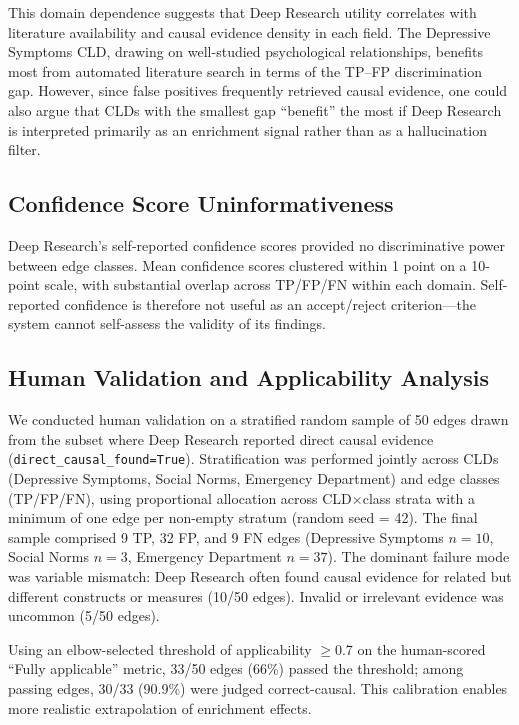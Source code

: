 This domain dependence suggests that Deep Research utility correlates with literature availability and causal evidence density in each field. The Depressive Symptoms CLD, drawing on well-studied psychological relationships, benefits most from automated literature search in terms of the TP--FP discrimination gap. However, since false positives frequently retrieved causal evidence, one could also argue that CLDs with the smallest gap ``benefit'' the most if Deep Research is interpreted primarily as an enrichment signal rather than as a hallucination filter.

\subsection{Confidence Score Uninformativeness}

Deep Research's self-reported confidence scores provided no discriminative power between edge classes. Mean confidence scores clustered within 1 point on a 10-point scale, with substantial overlap across TP/FP/FN within each domain. Self-reported confidence is therefore not useful as an accept/reject criterion---the system cannot self-assess the validity of its findings.

\subsection{Human Validation and Applicability Analysis}

We conducted human validation on a stratified random sample of 50 edges drawn from the subset where Deep Research reported direct causal evidence (\texttt{direct\_causal\_found=True}). Stratification was performed jointly across CLDs (Depressive Symptoms, Social Norms, Emergency Department) and edge classes (TP/FP/FN), using proportional allocation across CLD$\times$class strata with a minimum of one edge per non-empty stratum (random seed = 42). The final sample comprised 9 TP, 32 FP, and 9 FN edges (Depressive Symptoms $n=10$, Social Norms $n=3$, Emergency Department $n=37$). The dominant failure mode was variable mismatch: Deep Research often found causal evidence for related but different constructs or measures (10/50 edges). Invalid or irrelevant evidence was uncommon (5/50 edges).

Using an elbow-selected threshold of applicability $\geq$0.7 on the human-scored ``Fully applicable'' metric, 33/50 edges (66\%) passed the threshold; among passing edges, 30/33 (90.9\%) were judged correct-causal. This calibration enables more realistic extrapolation of enrichment effects.

